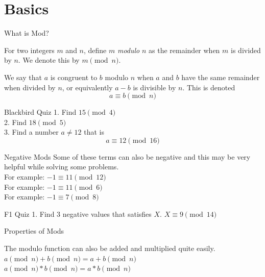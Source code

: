 \documentclass[aspectratio=169,xcolor=dvipsnames]{beamer}
\begin{document}
\section{Basics}
\begin{frame}{What is Mod?}
\begin{definition}
    For two integers $m$ and $n$, define $m$ \textit{modulo} $n$ as the remainder when $m$ is divided by $n$. We denote this by $m\pmod{n}$.
\end{definition}
\begin{definition}
    We say that $a$ is congruent to $b$ modulo $n$ when $a$ and $b$ have the same remainder when divided by $n$, or equivalently $a-b$ is divisible by $n$. This is denoted
    \[a\equiv b\pmod n\]
\end{definition}
    
\end{frame}
\begin{frame}{Blackbird Quiz}
    1. Find $15 \pmod{4}$ \\
    \vspace{1cm}
    2. Find $18 \pmod{5}$ \\
    \vspace{1cm}
    3. Find a number $a\neq12$ that is \[a\equiv 12\pmod{16}\]
\end{frame}
\begin{frame}{Negative Mods}
        Some of these terms can also be negative and this may be very helpful while solving some problems. \\
    For example: $-1 \equiv 11\pmod{12}$ \\
    For example: $-1 \equiv 11\pmod{6}$ \\
    For example: $-1 \equiv 7\pmod{8}$ 
\end{frame}

\begin{frame}{F1 Quiz}
1. Find 3 negative values that satisfies $X$. $X\equiv 9\pmod{14}$    
\end{frame}


\begin{frame}{Properties of Mods}
    \begin{definition}
        The modulo function can also be added and multiplied quite easily.\\
        $a\pmod{n}+b\pmod{n}  = a+b\pmod{n}$\\
        $a\pmod{n}*b\pmod{n}  = a*b\pmod{n}$\\
    \end{definition}
\end{frame}
\end{document}
